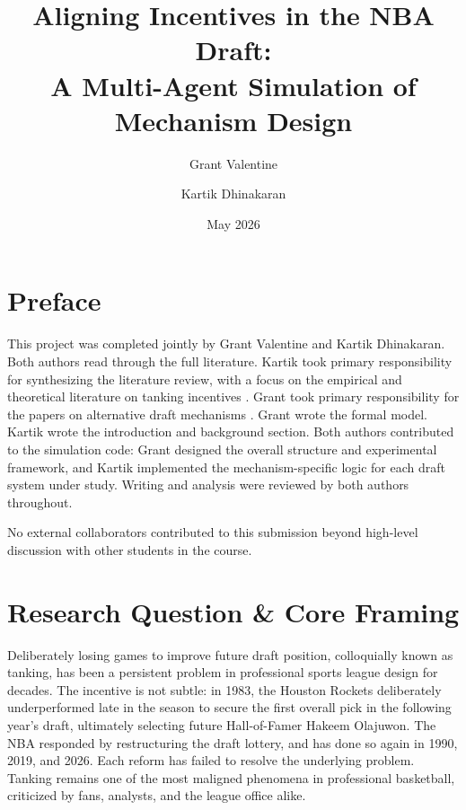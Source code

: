 \documentclass{article}
\title{Aligning Incentives in the NBA Draft:\\
       A Multi-Agent Simulation of Mechanism Design}
\author{Grant Valentine \and Kartik Dhinakaran}
\date{May 2026}
\begin{document}
\maketitle
\tableofcontents
\newpage


\section*{Preface}

This project was completed jointly by Grant Valentine and Kartik Dhinakaran.
Both authors read through the full literature.
Kartik took primary responsibility for synthesizing the literature review,
with a focus on the empirical and theoretical literature on tanking incentives
\citep{taylor2002, schmidt2024, lenten2016}.
Grant took primary responsibility for the papers on alternative draft
mechanisms \citep{banchio2020, kazachkov2020, highley2026}.
Grant wrote the formal model.
Kartik wrote the introduction and background section.
Both authors contributed to the simulation code: Grant designed the overall
structure and experimental framework, and Kartik implemented the
mechanism-specific logic for each draft system under study.
Writing and analysis were reviewed by both authors throughout.

No external collaborators contributed to this submission beyond high-level
discussion with other students in the course.


\section{Research Question \& Core Framing}

Deliberately losing games to improve future draft position, colloquially known
as tanking, has been a persistent problem in professional sports league design
for decades.
The incentive is not subtle: in 1983, the Houston Rockets deliberately
underperformed late in the season to secure the first overall pick in the
following year's draft, ultimately selecting future Hall-of-Famer Hakeem
Olajuwon.
The NBA responded by restructuring the draft lottery, and has done so again in
1990, 2019, and 2026.
Each reform has failed to resolve the underlying problem.
Tanking remains one of the most maligned phenomena in professional basketball,
criticized by fans, analysts, and the league office alike.
\end{document}
